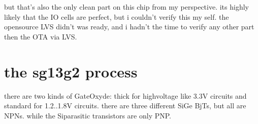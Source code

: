 \documentclass[letterpaper,10pt,english]{sphinxmanual}
\begin{document}
\sphinxAtStartPar
but that’s also the only clean part on this chip from my perspective. its highly likely that the IO cells are perfect, but i couldn’t verify this my self. the opensource LVS didn’t was ready, and i hadn’t the time to verify any other part then the OTA via LVS.


\chapter{the sg13g2 process}
\label{\detokenize{index:the-sg13g2-process}}
\sphinxAtStartPar
there are two kinds of GateOxyde: thick for high\sphinxhyphen{}voltage like 3.3V circuits and standard for 1.2..1.8V circuits. there are three different SiGe BjTs, but all are NPNs. while the Si\sphinxhyphen{}parasitic transistors are only PNP.



\renewcommand{\indexname}{Index}
\printindex
\end{document}
